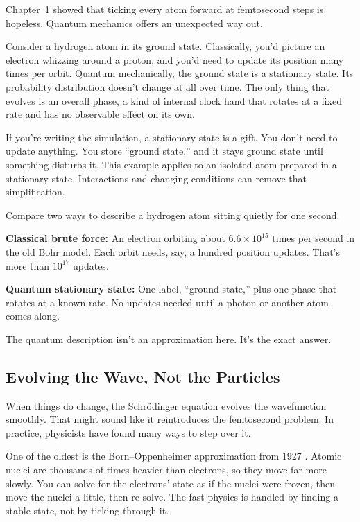Chapter~1 showed that ticking every atom forward at femtosecond steps is hopeless. Quantum mechanics offers an unexpected way out.

Consider a hydrogen atom in its ground state. Classically, you'd picture an electron whizzing around a proton, and you'd need to update its position many times per orbit. Quantum mechanically, the ground state is a stationary state. Its probability distribution doesn't change at all over time. The only thing that evolves is an overall phase, a kind of internal clock hand that rotates at a fixed rate and has no observable effect on its own.

If you're writing the simulation, a stationary state is a gift. You don't need to update anything. You store ``ground state,'' and it stays ground state until something disturbs it. This example applies to an isolated atom prepared in a stationary state. Interactions and changing conditions can remove that simplification.

\begin{examplebox}
Compare two ways to describe a hydrogen atom sitting quietly for one second.

\textbf{Classical brute force:} An electron orbiting about \(6.6 \times 10^{15}\) times per second in the old Bohr model. Each orbit needs, say, a hundred position updates. That's more than \(10^{17}\) updates.

\textbf{Quantum stationary state:} One label, ``ground state,'' plus one phase that rotates at a known rate. No updates needed until a photon or another atom comes along.

The quantum description isn't an approximation here. It's the exact answer.
\end{examplebox}

\subsection{Evolving the Wave, Not the Particles}

When things do change, the Schrödinger equation evolves the wavefunction smoothly. That might sound like it reintroduces the femtosecond problem. In practice, physicists have found many ways to step over it.

One of the oldest is the Born--Oppenheimer approximation from 1927 \cite{bornoppenheimer1927}. Atomic nuclei are thousands of times heavier than electrons, so they move far more slowly. You can solve for the electrons' state as if the nuclei were frozen, then move the nuclei a little, then re-solve. The fast physics is handled by finding a stable state, not by ticking through it.

